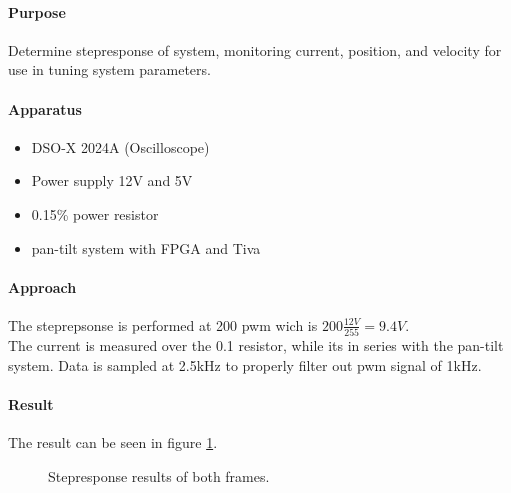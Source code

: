 \documentclass[../../main]{subfiles}
\begin{document}
\paragraph{Purpose}%
\label{par:purpose}

Determine stepresponse of system, monitoring current, position, and velocity for use in tuning system parameters.

\paragraph{Apparatus}%
\label{par:apperateur}
\begin{itemize}
	\item DSO-X 2024A (Oscilloscope)
	\item Power supply 12\si{V} and 5\si{V}
	\item 0.1\si{\Omega}5\% power resistor
	\item pan-tilt system with FPGA and Tiva
\end{itemize}


\paragraph{Approach}%
\label{par:approach}
The steprepsonse is performed at 200 pwm wich is $200\frac{12\si{V}}{255} = 9.4\si{V}$.\\
The current is measured over the 0.1\si{\Omega} resistor, while its in series with the pan-tilt system.
Data is sampled at 2.5\si{kHz} to properly filter out pwm signal of 1\si{kHz}.

\paragraph{Result}%
\label{par:result}

The result can be seen in figure \ref{fig:jour_step_bot}.


\begin{figure}[H]
        \centering
				\def\svgwidth{0.47\columnwidth}
				\def\svgwidth{0.47\columnwidth}
				\caption{Stepresponse results of both frames.}
				\label{fig:jour_step_bot}
\end{figure}
\end{document}

